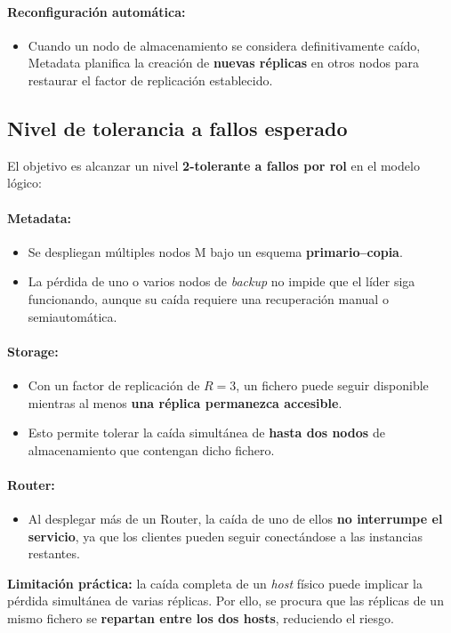 \documentclass{article}
\begin{document}
\paragraph{Reconfiguración automática:}
\begin{itemize}
    \item Cuando un nodo de almacenamiento se considera definitivamente caído, Metadata planifica la creación de \textbf{nuevas réplicas} en otros nodos para restaurar el factor de replicación establecido.
\end{itemize}

\subsection{Nivel de tolerancia a fallos esperado}
El objetivo es alcanzar un nivel \textbf{2-tolerante a fallos por rol} en el modelo lógico:

\paragraph{Metadata:}
\begin{itemize}
    \item Se despliegan múltiples nodos M bajo un esquema \textbf{primario–copia}.
    \item La pérdida de uno o varios nodos de \emph{backup} no impide que el líder siga funcionando, aunque su caída requiere una recuperación manual o semiautomática.
\end{itemize}

\paragraph{Storage:}
\begin{itemize}
    \item Con un factor de replicación de $R=3$, un fichero puede seguir disponible mientras al menos \textbf{una réplica permanezca accesible}.
    \item Esto permite tolerar la caída simultánea de \textbf{hasta dos nodos} de almacenamiento que contengan dicho fichero.
\end{itemize}

\paragraph{Router:}
\begin{itemize}
    \item Al desplegar más de un Router, la caída de uno de ellos \textbf{no interrumpe el servicio}, ya que los clientes pueden seguir conectándose a las instancias restantes.
\end{itemize}
\textbf{Limitación práctica:} la caída completa de un \emph{host} físico puede implicar la pérdida simultánea de varias réplicas. Por ello, se procura que las réplicas de un mismo fichero se \textbf{repartan entre los dos hosts}, reduciendo el riesgo.
\end{document}
